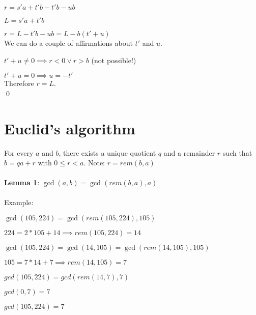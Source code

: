 \documentclass{article}
\begin{document}
	$r = s'a + t'b - t'b - ub$
	
	$L = s'a + t'b$
	
	$r = L - t'b - ub = L - b(t' + u)$
	\\
	We can do a couple of affirmations about $t'$ and $u$.
	
	$t' + u \neq 0 \implies r < 0 \lor r > b$ (not possible!)
	
	$t' + u = 0 \implies u = -t'$
	\\
	Therefore $r = L$.\\
	\qed
	
	\pagebreak
	
	\section{Euclid's algorithm}
	For every $a$ and $b$, there exists a unique quotient $q$ and a remainder $r$ such that $b = qa + r$ with $0 \leq r < a$. Note: $r = rem(b, a)$\\
	\\
	\textbf{Lemma 1}: $\gcd(a, b) = \gcd(rem(b, a), a)$\\
	\\
	Example:
	
	$\gcd(105, 224) = \gcd(rem(105, 224), 105)$
	
	$224 = 2 * 105 + 14 \implies rem(105, 224) = 14$
	
	$\gcd(105, 224) = \gcd(14, 105) = \gcd(rem(14, 105), 105)$
	
	$105 = 7 * 14 + 7 \implies rem(14, 105) = 7$
	
	$gcd(105, 224) = gcd(rem(14, 7), 7)$
	
	$gcd(0, 7) = 7$
	
	$gcd(105, 224) = 7$
\end{document}
